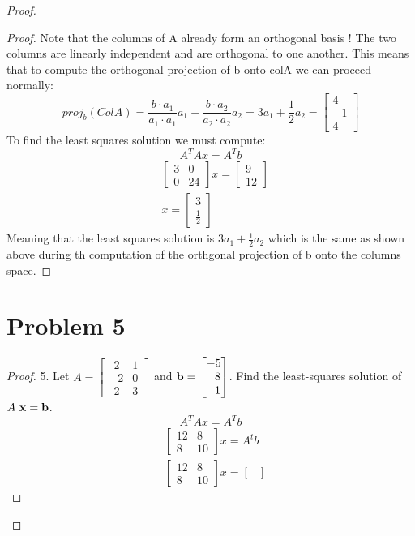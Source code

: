 \documentclass[12pt]{article}
\newcommand{\sect}[1]{\section*{#1}}
\begin{document}
\begin{proof}
\begin{proof}
  Note that the columns of A already form an orthogonal basis ! The two columns are linearly independent and are orthogonal to one another. This means that to compute the orthogonal projection of b onto colA we can proceed normally:
  \[
    proj_b(ColA)=\frac{b\cdot a_1}{a_1\cdot a_1}a_1+\frac{b \cdot a_2}{a_2 \cdot a_2}a_2=3a_1+\frac{1}{2}a_2=\begin{bmatrix}
      4\\-1\\4
  \end{bmatrix}
  \]
  To find the least squares solution we must compute:
  \[
    A^TAx=A^Tb
  \]
  \begin{align*}
    &\begin{bmatrix}
      3&0\\0&24
  \end{bmatrix}x=\begin{bmatrix}
    9\\12
  \end{bmatrix}\\
  &x=\begin{bmatrix}
    3\\\frac{1}{2}
  \end{bmatrix}
    \end{align*}
      Meaning that the least squares solution is $3a_1+\frac{1}{2}a_2$ which is the same as shown above during th computation of the orthgonal projection of b onto the columns space.
  \end{proof}
\sect{Problem 5}
\begin{proof}
    5. Let $A = \begin{bmatrix}~~2 & 1\\-2 & 0\\~~2 & 3\end{bmatrix}$ and ${\bf b} = \begin{bmatrix}-5\\~~8\\~~1\end{bmatrix}$. Find the least-squares solution of $A~{\bf x} = {\bf b}$.
    \vskip 10pt
  \[
    A^TAx=A^Tb
  \]
  \begin{align*}
    &\begin{bmatrix}
      12&8\\8&10
    \end{bmatrix}x=A^tb\\
    &\begin{bmatrix}
      12&8\\8&10
    \end{bmatrix}x=\begin{bmatrix}

\end{bmatrix}
\end{align*}
\end{proof}
\end{proof}
\end{document}
